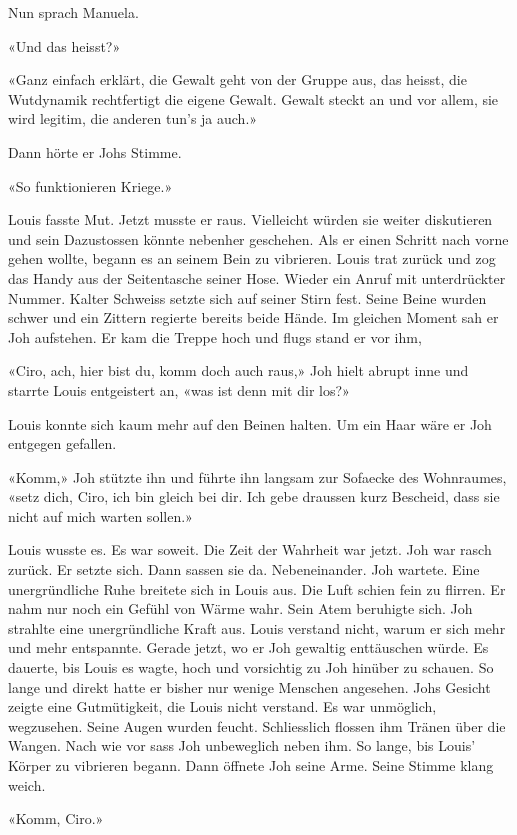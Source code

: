 Nun sprach Manuela.

«Und das heisst?»

«Ganz einfach erklärt, die Gewalt geht von der Gruppe aus, das heisst,
die Wutdynamik rechtfertigt die eigene Gewalt. Gewalt steckt an und vor
allem, sie wird legitim, die anderen tun’s ja auch.»

Dann hörte er Johs Stimme.

«So funktionieren Kriege.»

Louis fasste Mut. Jetzt musste er raus. Vielleicht würden sie
weiter diskutieren und sein Dazustossen könnte nebenher geschehen. Als er
einen Schritt nach vorne gehen wollte, begann es an seinem Bein zu
vibrieren. Louis trat zurück und zog das Handy aus der Seitentasche
seiner Hose. Wieder ein Anruf mit unterdrückter Nummer. Kalter Schweiss
setzte sich auf seiner Stirn fest. Seine Beine wurden schwer und ein
Zittern regierte bereits beide Hände. Im gleichen Moment sah er Joh aufstehen. Er kam die Treppe hoch und flugs stand er vor ihm,

«Ciro, ach, hier bist du, komm doch auch raus,» Joh hielt abrupt inne und
starrte Louis entgeistert an, «was ist denn mit dir los?»

Louis konnte sich kaum mehr auf den Beinen halten. Um ein Haar wäre er
Joh entgegen gefallen.

«Komm,» Joh stützte ihn und führte ihn langsam zur Sofaecke des
Wohnraumes, «setz dich, Ciro, ich bin gleich bei dir. Ich gebe draussen
kurz Bescheid, dass sie nicht auf mich warten sollen.»

Louis wusste es. Es war soweit. Die Zeit der Wahrheit war jetzt.
Joh war rasch zurück. Er setzte sich. Dann sassen sie da.
Nebeneinander. Joh wartete.
Eine unergründliche Ruhe breitete sich in Louis aus. Die Luft schien
fein zu flirren. Er nahm nur noch ein Gefühl von Wärme wahr. Sein Atem
beruhigte sich. Joh strahlte eine unergründliche Kraft aus. Louis verstand nicht, warum 
er sich mehr und mehr entspannte.  Gerade jetzt, wo er Joh gewaltig enttäuschen würde.
Es dauerte, bis Louis es wagte, hoch und vorsichtig 
zu Joh hinüber zu schauen. So lange und direkt hatte er bisher nur
wenige Menschen angesehen. Johs Gesicht zeigte eine Gutmütigkeit, die Louis nicht verstand. 
Es war unmöglich, wegzusehen. Seine Augen wurden feucht. Schliesslich flossen ihm Tränen über die  Wangen. Nach wie vor sass Joh unbeweglich neben ihm. So lange, bis Louis’ Körper zu vibrieren begann. 
Dann öffnete Joh seine Arme. Seine Stimme klang weich.

«Komm, Ciro.»

